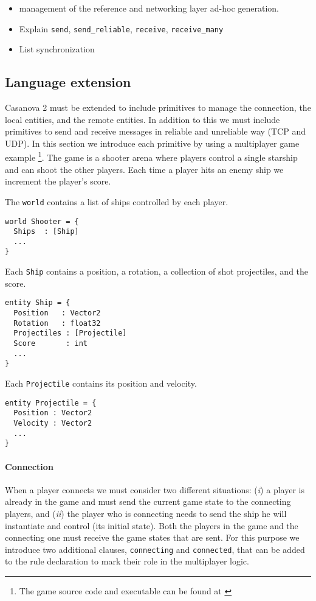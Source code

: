 \begin{itemize}
	\item management of the reference and networking layer ad-hoc generation.
	\item Explain \texttt{send}, \texttt{send\_reliable}, \texttt{receive}, \texttt{receive\_many}
	\item List synchronization
\end{itemize}

\subsection*{Language extension}
Casanova 2 must be extended to include primitives to manage the connection, the local entities, and the remote entities. In addition to this we must include primitives to send and receive messages in reliable and unreliable way (TCP and UDP). In this section we introduce each primitive by using a multiplayer game example \footnote{The game source code and executable can be found at \cite{MULTIPLAER_SHOOTER}}. The game is a shooter arena where players control a single starship and can shoot the other players. Each time a player hits an enemy ship we increment the player's score.  


The \texttt{world} contains a list of ships controlled by each player.
\begin{lstlisting}
world Shooter = {
  Ships  : [Ship]
  ...
}
\end{lstlisting}

Each \texttt{Ship} contains a position, a rotation, a collection of shot projectiles, and the score.
\begin{lstlisting}
entity Ship = {
  Position   : Vector2
  Rotation   : float32
  Projectiles : [Projectile]
  Score		  : int
  ...
}

\end{lstlisting}

Each \texttt{Projectile} contains its position and velocity.

\begin{lstlisting}
entity Projectile = {
  Position : Vector2
  Velocity : Vector2
  ...
}
\end{lstlisting}

\paragraph*{Connection}
When a player connects we must consider two different situations: (\textit{i}) a player is already in the game and must send the current game state to the connecting players, and (\textit{ii}) the player who is connecting needs to send the ship he will instantiate and control (its initial state). Both the players in the game and the connecting one must receive the game states that are sent. For this purpose we introduce two additional clauses, \texttt{connecting} and \texttt{connected}, that can be added to the rule declaration to mark their role in the multiplayer logic.

